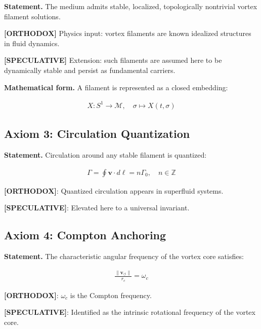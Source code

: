 \documentclass[11pt]{article}
\theoremstyle{definition}
\theoremstyle{plain}
\theoremstyle{remark}
\newcommand{\rc}{{r_c}}
\newcommand{\vnorm}{\lVert \mathbf{v}_{\!\boldsymbol{\circlearrowleft}} \rVert}
\begin{document}
        \textbf{Statement.}
        The medium admits stable, localized, topologically nontrivial vortex filament solutions.
        
        \textbf{[ORTHODOX]} Physics input: vortex filaments are known idealized structures in fluid dynamics.

        \textbf{[SPECULATIVE]} Extension: such filaments are assumed here to be dynamically stable and persist as fundamental carriers.
        
        \textbf{Mathematical form.}
        A filament is represented as a closed embedding:
        
        \begin{align}
            X: S^1 \to \mathcal{M}, \quad \sigma \mapsto X(t,\sigma)
        \end{align}
    
    \subsection{Axiom 3: Circulation Quantization}
        
        \textbf{Statement.}
        Circulation around any stable filament is quantized:
        
        \begin{align}
            \Gamma = \oint \mathbf{v} \cdot d\ell = n \Gamma_0, \quad n \in \mathbb{Z}
        \end{align}
        
        \textbf{[ORTHODOX]}: Quantized circulation appears in superfluid systems.
        
        \textbf{[SPECULATIVE]}: Elevated here to a universal invariant.
    
    \subsection{Axiom 4: Compton Anchoring}
        
        \textbf{Statement.}
        The characteristic angular frequency of the vortex core satisfies:
        
        \begin{align}
            \frac{\vnorm}{\rc} = \omega_c
        \end{align}
        
        \textbf{[ORTHODOX]}: $\omega_c$ is the Compton frequency.
        
        \textbf{[SPECULATIVE]}: Identified as the intrinsic rotational frequency of the vortex core.
        
\end{document}
